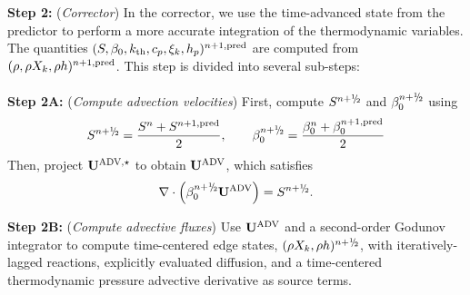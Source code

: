 {\bf Step 2:} ({\it Corrector}) In the corrector, we use the time-advanced state from the predictor to perform a more accurate integration of the thermodynamic variables.  The quantities $(S, \beta_0, k_{\rm th}, c_p, \xi_k, h_p)^{n+1,{\rm pred}}$ are computed from $(\rho,\rho X_k,\rho h)^{n+1,{\rm pred}}$.  This step is divided into several sub-steps:\\\\

{\bf Step 2A:} ({\it Compute advection velocities}) First, compute $S^{n+\myhalf}$ and $\beta_0^{n+\myhalf}$ using
\begin{equation}
S^{n+\myhalf} = \frac{S^n + S^{n+1,{\rm pred}}}{2}, \qquad \beta_0^{n+\myhalf} = \frac{\beta_0^n + \beta_0^{n+1,{\rm pred}}}{2}
\end{equation}
Then, project $\mathbf{U}^{\mathrm{ADV},\star}$ to obtain $\mathbf{U}^{\mathrm{ADV}}$, which satisfies
\begin{equation}
\nabla\cdot\left(\beta_0^{n+\myhalf}\uadvsdc\right) = S^{n+\myhalf}.
\end{equation}

{\bf Step 2B:} ({\it Compute advective fluxes}) Use $\mathbf{U}^{\mathrm{ADV}}$ and a second-order Godunov integrator to compute time-centered edge states, $(\rho X_k, \rho h)^{n+\myhalf}$, with iteratively-lagged reactions, explicitly evaluated diffusion, and a time-centered thermodynamic pressure advective derivative as source terms.\\


